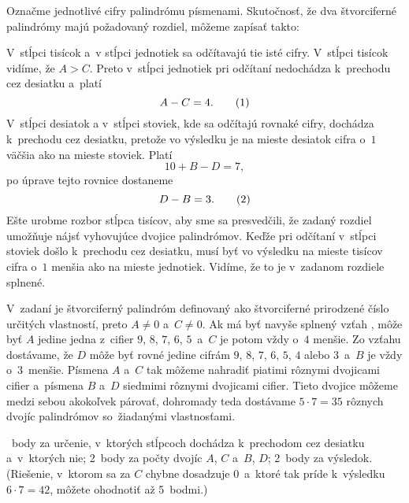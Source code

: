 {%
Označme jednotlivé cifry palindrómu písmenami. Skutočnosť, že dva
štvorciferné palindrómy majú požadovaný rozdiel, môžeme zapísať takto:

V~stĺpci tisícok a~v stĺpci jednotiek sa odčítavajú tie isté cifry. V~stĺpci tisícok vidíme,
že $A>C$. Preto v~stĺpci jednotiek pri odčítaní nedochádza k~prechodu cez desiatku a~platí
$$
A-C=4.
\tag1
$$
V~stĺpci desiatok a v~stĺpci stoviek, kde sa odčítajú rovnaké cifry, dochádza
k~prechodu cez desiatku, pretože vo výsledku je na mieste desiatok
cifra o~$1$ väčšia ako na mieste stoviek. Platí
$$
10 + B - D = 7,
$$
po úprave tejto rovnice dostaneme
$$
D -B = 3.
\tag2
$$
Ešte urobme rozbor stĺpca tisícov, aby sme sa presvedčili, že zadaný rozdiel
umožňuje nájsť vyhovujúce dvojice palindrómov. Keďže pri odčítaní
v~stĺpci stoviek došlo k~prechodu cez desiatku, musí byť vo výsledku na
mieste tisícov cifra o~$1$ menšia ako na mieste jednotiek. Vidíme, že to je
v~zadanom rozdiele splnené.

V~zadaní je štvorciferný palindróm definovaný ako štvorciferné prirodzené číslo
určitých vlastností, preto $A\ne 0$ a~$C\ne 0$. Ak má byť navyše splnený vzťah ,
môže byť $A$ jedine jedna z~cifier $9$, $8$, $7$, $6$, $5$~a~$C$ je potom vždy o~$4$ menšie.
Zo vzťahu  dostávame, že $D$ môže byť rovné jedine cifrám $9$, $8$, $7$, $6$, $5$,
$4$ alebo $3$~a~$B$ je vždy o~$3$~menšie. Písmena $A$ a~$C$ tak môžeme nahradiť piatimi
rôznymi dvojicami cifier a~písmena $B$ a~$D$ siedmimi rôznymi dvojicami cifier.
Tieto dvojice môžeme medzi sebou akokoľvek párovať, dohromady teda dostávame
$5\cdot 7= 35$ rôznych dvojíc palindrómov so~žiadanými vlastnosťami.

~body za určenie, v~ktorých stĺpcoch dochádza k~prechodom cez desiatku a~v~ktorých nie;
2~body za počty dvojíc $A$, $C$ a~$B$, $D$;
2~body za výsledok.
(Riešenie, v~ktorom sa za $C$ chybne dosadzuje $0$~a~ktoré tak príde k~výsledku $6\cdot 7=42$, môžete ohodnotiť až 5~bodmi.)
\endhodnotenie
}

